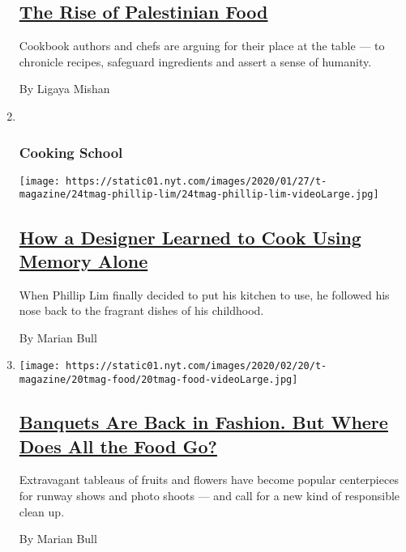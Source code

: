 \begin{enumerate}
  \hypertarget{the-rise-of-palestinian-food}{%
  \subsection{\texorpdfstring{\href{/2020/02/12/t-magazine/palestinian-food.html}{The
  Rise of Palestinian
  Food}}{The Rise of Palestinian Food}}\label{the-rise-of-palestinian-food}}

  Cookbook authors and chefs are arguing for their place at the table
  --- to chronicle recipes, safeguard ingredients and assert a sense of
  humanity.

  By Ligaya Mishan
\item ~
  \hypertarget{cooking-school}{%
  \subsubsection{Cooking School}\label{cooking-school}}

  \texttt{[image: https://static01.nyt.com/images/2020/01/27/t-magazine/24tmag-phillip-lim/24tmag-phillip-lim-videoLarge.jpg]}

  \hypertarget{how-a-designer-learned-to-cook-using-memory-alone}{%
  \subsection{\texorpdfstring{\href{/2020/01/24/t-magazine/phillip-lim-shrimp-recipe.html}{How
  a Designer Learned to Cook Using Memory
  Alone}}{How a Designer Learned to Cook Using Memory Alone}}\label{how-a-designer-learned-to-cook-using-memory-alone}}

  When Phillip Lim finally decided to put his kitchen to use, he
  followed his nose back to the fragrant dishes of his childhood.

  By Marian Bull
\item
  \texttt{[image: https://static01.nyt.com/images/2020/02/20/t-magazine/20tmag-food/20tmag-food-videoLarge.jpg]}

  \hypertarget{banquets-are-back-in-fashion-but-where-does-all-the-food-go}{%
  \subsection{\texorpdfstring{\href{/2020/02/21/t-magazine/fashion-banquet-food-waste.html}{Banquets
  Are Back in Fashion. But Where Does All the Food
  Go?}}{Banquets Are Back in Fashion. But Where Does All the Food Go?}}\label{banquets-are-back-in-fashion-but-where-does-all-the-food-go}}

  Extravagant tableaus of fruits and flowers have become popular
  centerpieces for runway shows and photo shoots --- and call for a new
  kind of responsible clean up.

  By Marian Bull
\end{enumerate}

